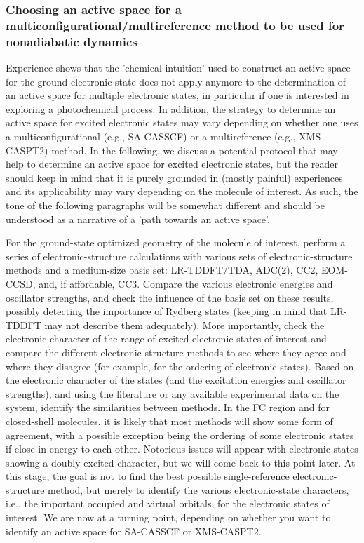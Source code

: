 \documentclass[9pt,bestpractices]{livecoms}
\begin{document}
\subsubsection{Choosing an active space for a multiconfigurational/multireference method to be used for nonadiabatic dynamics}
\label{sec:activespace}

Experience shows that the 'chemical intuition' used to construct an active space for the ground electronic state does not apply anymore to the determination of an active space for multiple electronic states, in particular if one is interested in exploring a photochemical process. In addition, the strategy to determine an active space for excited electronic states may vary depending on whether one uses a multiconfigurational (e.g., SA-CASSCF) or a multireference (e.g., XMS-CASPT2) method. In the following, we discuss a potential protocol that may help to determine an active space for excited electronic states, but the reader should keep in mind that it is purely grounded in (mostly painful) experiences and its applicability may vary depending on the molecule of interest. As such, the tone of the following paragraphs will be somewhat different and should be understood as a narrative of a 'path towards an active space'.

For the ground-state optimized geometry of the molecule of interest, perform a series of electronic-structure calculations with various sets of electronic-structure methods and a medium-size basis set: LR-TDDFT/TDA, ADC(2), CC2, EOM-CCSD, and, if affordable, CC3. Compare the various electronic energies and oscillator strengths, and check the influence of the basis set on these results, possibly detecting the importance of Rydberg states (keeping in mind that LR-TDDFT may not describe them adequately). More importantly, check the electronic character of the range of excited electronic states of interest and compare the different electronic-structure methods to see where they agree and where they disagree (for example, for the ordering of electronic states). Based on the electronic character of the states (and the excitation energies and oscillator strengths), and using the literature or any available experimental data on the system, identify the similarities between methods. In the FC region and for closed-shell molecules, it is likely that most methods will show some form of agreement, with a possible exception being the ordering of some electronic states if close in energy to each other. Notorious issues will appear with electronic states showing a doubly-excited character, but we will come back to this point later. At this stage, the goal is not to find the best possible single-reference electronic-structure method, but merely to identify the various electronic-state characters, i.e., the important occupied and virtual orbitals, for the electronic states of interest. We are now at a turning point, depending on whether you want to identify an active space for SA-CASSCF  or XMS-CASPT2. 
\end{document}
